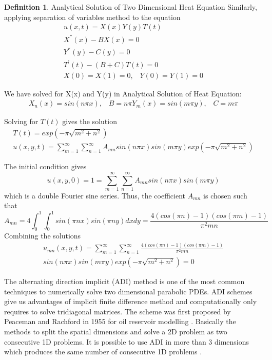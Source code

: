 \documentclass[12pt, oneside]{book}
\theoremstyle{plain}
\theoremstyle{definition}
\newtheorem{definition}[theorem]{Definition}
\begin{document}
\begin{definition} Analytical Solution of Two Dimensional Heat Equation
Similarly, applying separation of variables method to the equation
\begin{eqnarray}
u(x,t) = X(x) Y(y) T(t) \\[10pt]
X^{''}(x) - B X(x) = 0 \\[10pt]
Y^{''}(y) - C (y) = 0 \\[10pt]
T^{'}(t) - (B + C) T(t) = 0 \\[10pt]
X(0) = X(1) = 0, \hspace{10pt} Y(0) = Y(1) = 0
\end{eqnarray}

We have solved for X(x) and Y(y) in Analytical Solution of Heat Equation:
\begin{eqnarray} 
X_n (x)=  sin(n \pi x), \hspace{10pt} B = n \pi
Y_m (x)=  sin(m \pi y), \hspace{10pt} C = m \pi
\end{eqnarray}

Solving for $T(t)$ gives the solution
\begin{eqnarray}
T(t) = exp(- \pi \sqrt{m^2 + n^2}) \\[10pt]
u(x, y, t) =\sum_{m=1}^{\infty} \sum_{n=1}^{\infty} A_{mn}  sin(n \pi x) sin(m \pi y) exp(- \pi \sqrt{m^2 + n^2})
\end{eqnarray}

The initial condition gives
\begin{equation}
u(x, y, 0) = 1 = \sum_{m=1}^{\infty} \sum_{n=1}^{\infty}  A_{mn} sin(n \pi x) sin(m \pi y)
\end{equation}
which is a double Fourier sine series. Thus, the coefficient $A_{mn}$ is chosen such that
\begin{equation}
 A_{mn} = 4 \int_{0}^{1}  \int_{0}^{1} sin(\pi n x)  sin(\pi n y) dx dy = \frac{4(cos(\pi n) - 1)(cos(\pi m) - 1)}{\pi^2 m n} 
\end{equation}
Combining the solutions
\begin{multline}
u_{mn}(x, y, t) =  \sum_{m=1}^{\infty} \sum_{n=1}^{\infty} \frac{4(cos(\pi n) - 1)(cos(\pi m) - 1)}{\pi^2 m n}  \\ sin(n \pi x) sin(m \pi y) exp(- \pi \sqrt{m^2 + n^2}) = 0
\end{multline}

\end{definition}


The alternating direction implicit (ADI) method is one of the most common techniques to numerically solve two dimensional parabolic PDEs. ADI schemes give us advantages of implicit finite difference method and computationally only requires to solve tridiagonal matrices.  The scheme was first proposed by Peaceman and Rachford in 1955 for  oil reservoir modelling \cite{peace}. Basically the methods to split the spatial dimensions and solve a 2D problem as two consecutive 1D problems. It is possible to use ADI in more than 3 dimensions which produces the same number of consecutive 1D problems \cite{DougADI}.
\end{document}
